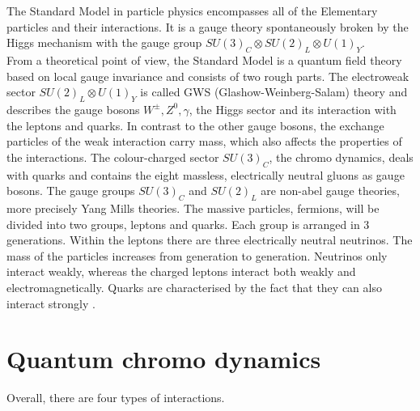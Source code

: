 The Standard Model in particle physics encompasses all of the
Elementary particles and their interactions. It is a gauge theory spontaneously broken by the Higgs mechanism with the gauge group $ SU(3)_C \otimes SU(2)_L \otimes U(1)_Y $.\\
From a theoretical point of view, the Standard Model is a quantum field theory based on local gauge invariance and consists of two rough parts. The electroweak sector $ SU(2)_L \otimes U(1)_Y $ is called GWS (Glashow-Weinberg-Salam) theory and describes the gauge bosons $ W^{\pm}, Z^0, \gamma $, the Higgs sector and its interaction with the leptons and quarks. In contrast to the other gauge bosons, the exchange particles of the weak interaction carry mass, which also affects the properties of the interactions. The colour-charged sector $ SU(3)_C $, the chromo dynamics, deals with quarks and contains the eight massless, electrically neutral gluons as gauge bosons. The gauge groups $SU(3)_C$ and $SU(2)_L$ are 
non-abel gauge theories, more precisely Yang Mills theories.
The massive particles, fermions, will be divided into two groups, leptons and quarks. Each group is arranged in 3 generations. Within the leptons there are three electrically neutral neutrinos. The mass of the particles increases from generation to generation. Neutrinos only interact weakly, whereas the charged leptons interact both weakly and electromagnetically. Quarks are characterised by the fact that they can also interact strongly \cite{edelhaeuser2016tutorium}. 

\section{Quantum chromo dynamics}

Overall, there are four types of interactions.\\


